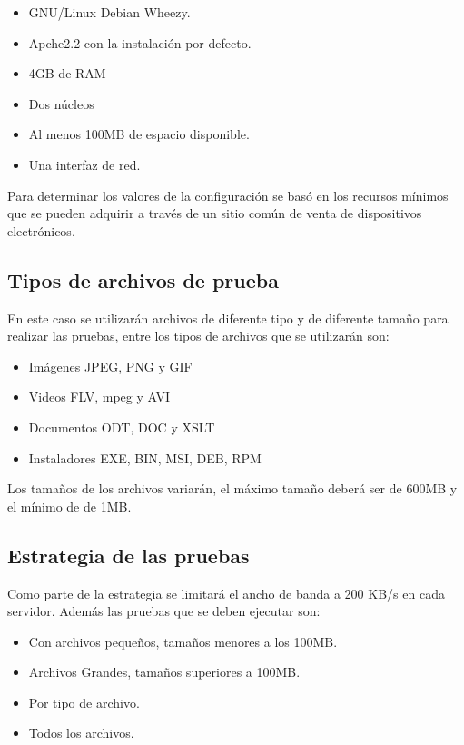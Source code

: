 \begin{itemize}
\item GNU/Linux Debian Wheezy.
\item Apche2.2 con la instalación por defecto.
\item 4GB de RAM 
\item Dos núcleos
\item Al menos 100MB de espacio disponible.
\item Una interfaz de red.
\end{itemize}

Para determinar los valores de la configuración se basó en los recursos mínimos que se pueden adquirir a través de un sitio común de venta de dispositivos electrónicos. 

\subsection{Tipos de archivos de prueba}
\label{subsec:archivos}
En este caso se utilizarán archivos de diferente tipo y de diferente tamaño para realizar las pruebas, entre los tipos de archivos que se utilizarán son:

\begin{itemize}
\item Imágenes JPEG, PNG y GIF
\item Videos FLV, mpeg y AVI
\item Documentos ODT, DOC y XSLT
\item Instaladores EXE, BIN, MSI, DEB, RPM
\end{itemize}

Los tamaños de los archivos variarán, el máximo tamaño deberá ser de 600MB y el mínimo de de 1MB.

\subsection{Estrategia de las pruebas}
\label{subsec:estrategia_pruebas}
Como parte de la estrategia se limitará el ancho de banda a 200 KB/s en cada servidor. Además las pruebas que se deben ejecutar son:

\begin{itemize}
\item Con archivos pequeños, tamaños menores a los 100MB.
\item Archivos Grandes, tamaños superiores a 100MB.
\item Por tipo de archivo.
\item Todos los archivos.
\end{itemize}


